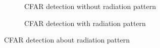 \documentclass[12pt,DIV14,BCOR12mm,a4paper,footinclude=false,headinclude,parskip=half-,twoside,openright,cleardoublepage=empty,toc=index,bibliography=totoc,listof=totoc]{scrreprt}
\numberwithin{equation}{chapter}
\begin{document}
\begin{figure}[t]
    \centering
    \begin{subfigure}{0.45\textwidth}
        \centering
        \caption{CFAR detection without radiation pattern}
    \end{subfigure}\hspace{0.5cm}
    \begin{subfigure}{0.45\textwidth}
        \centering
        \caption{CFAR detection with radiation pattern}
        \label{cfar detection with radiation pattern}
    \end{subfigure}
    \caption{CFAR detection about radiation pattern}
    \label{cfar detection about radiation pattern}
\end{figure}
\end{document}
